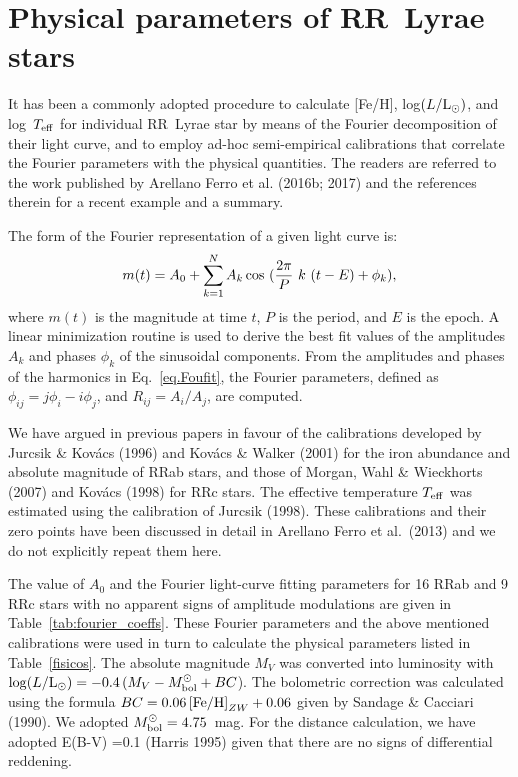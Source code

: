 \documentclass[journal]{rmaa}
\newcommand{\1}{\'{\i}}
\begin{document}
\section{Physical parameters of RR~Lyrae stars}
\label{sec:Four}

It has been a commonly adopted procedure to calculate [Fe/H], log$(L/{\rm
L_{\odot}})$, and log~$T_{\rm eff}$ for individual RR~Lyrae star by means of the
Fourier decomposition of their light curve, and to employ ad-hoc semi-empirical
calibrations that correlate the Fourier parameters with the physical quantities. The
readers are referred to the work published by Arellano Ferro et al. (2016b; 2017) and
the references therein for a recent example and a summary.

The form of the Fourier representation of a given light curve is:
%
\begin{equation}
\label{eq.Foufit}
m(t) = A_0 + \sum_{k=1}^{N}{A_k \cos\ ({2\pi \over P}~k~(t-E) + \phi_k) },
\end{equation}
%
where $m(t)$ is the magnitude at time $t$, $P$ is the period, and $E$ is the epoch. A
linear
minimization routine is used to derive the best fit values of the
amplitudes $A_k$ and phases $\phi_k$ of the sinusoidal components.
From the amplitudes and phases of the harmonics in Eq.~\ref{eq.Foufit}, the
Fourier parameters, defined as $\phi_{ij} = j\phi_{i} - i\phi_{j}$, and $R_{ij} = A_{i}/A_{j}$,
are computed.


We have argued in previous papers in favour of the calibrations developed by Jurcsik
\& Kov\'acs (1996) and Kov\'acs \& Walker (2001) for the iron abundance and absolute
magnitude of RRab stars, and those of Morgan, Wahl \& Wieckhorts (2007) and Kov\'acs
(1998) for RRc stars.
The effective temperature $T_{\rm eff}$ was estimated using the calibration of Jurcsik
(1998). These calibrations and their zero points have been discussed in detail in
Arellano Ferro et al.\ (2013) and we do not explicitly repeat them here.

The value of $A_0$ and the Fourier light-curve fitting parameters
for 16 RRab and 9 RRc stars with no apparent signs of amplitude modulations
are given in Table~\ref{tab:fourier_coeffs}. These Fourier parameters and the above
mentioned
calibrations were used in turn to calculate the physical parameters listed in
Table~\ref{fisicos}. The absolute magnitude $M_V$ was converted into luminosity with
$\log (L/{\rm L_{\odot}})=-0.4\, (M_V-M^\odot_{\rm bol}+BC$). The bolometric
correction was
calculated using the formula $BC= 0.06\, {\rm [Fe/H]}_{ZW}+0.06$ given by Sandage \&
Cacciari (1990). We adopted  $M^\odot_{\rm bol}=4.75$~mag. For the distance
calculation, we have adopted E(B-V) =0.1 (Harris 1995) given that there are no signs
of differential reddening.
\end{document}
